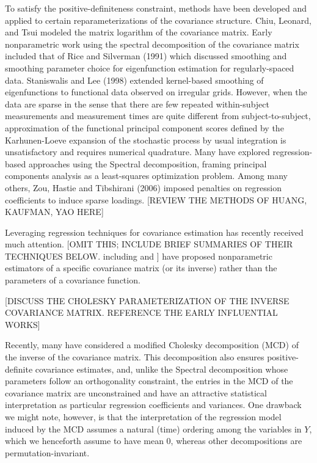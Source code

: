 \documentclass[12pt]{article}
\newcommand*\needsparaphrased{\color{red}}
\begin{document}
To satisfy the positive-definiteness constraint, methods have been developed and applied to certain reparameterizations of the covariance structure. Chiu, Leonard, and Tsui modeled the matrix logarithm of the covariance matrix. Early nonparametric work using the spectral decomposition of the covariance matrix included that of Rice and Silverman (1991) which discussed smoothing and smoothing parameter choice for eigenfunction estimation for regularly-spaced data. Staniswalis and Lee (1998) extended kernel-based smoothing of eigenfunctions to functional data observed on irregular grids. However, when the data are sparse in the sense that there are few repeated within-subject measurements and measurement times are quite different from subject-to-subject, approximation of the functional principal component scores defined by the Karhunen-Loeve expansion of the stochastic process by usual integration is unsatisfactory and requires numerical quadrature. Many have explored regression-based approaches using the Spectral decomposition, framing principal components analysis as a least-squares optimization problem. Among many others, Zou, Hastie and Tibshirani (2006) imposed penalties on regression coefficients to induce sparse loadings. {\needsparaphrased[REVIEW THE METHODS OF HUANG, KAUFMAN, YAO HERE]}


Leveraging regression techniques for covariance estimation has recently received much attention.  {[\needsparaphrased OMIT THIS; INCLUDE BRIEF SUMMARIES OF THEIR TECHNIQUES BELOW. including \citet{bickel2008regularized} and \citet{huang2006covariance}}] have proposed nonparametric estimators of a specific covariance matrix (or its inverse) rather than the parameters of a covariance function. 

{\needsparaphrased[DISCUSS THE CHOLESKY PARAMETERIZATION OF THE INVERSE COVARIANCE MATRIX. REFERENCE THE EARLY INFLUENTIAL WORKS]}

Recently, many have considered a modified Cholesky decomposition (MCD) of the inverse of the covariance matrix. This decomposition also ensures positive-definite covariance estimates, and, unlike the Spectral decomposition whose parameters follow an orthogonality constraint, the entries in the MCD of the covariance matrix are unconstrained and have an attractive statistical interpretation as particular regression coefficients and variances.  One drawback we might note, however, is that the interpretation of  the regression model induced by the MCD assumes a natural (time) ordering among the variables in $Y$, which we henceforth assume to have mean $0$, whereas other decompositions are permutation-invariant.
\end{document}
